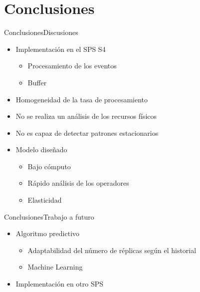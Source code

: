\section{Conclusiones}
\begin{frame}{Conclusiones}{Discusiones}

\begin{itemize}
\item Implementación en el SPS S4
\begin{itemize}
	\item Procesamiento de los eventos
	\item Buffer
\end{itemize}
\item Homogeneidad de la tasa de procesamiento
\item No se realiza un análisis de los recursos físicos
\item No es capaz de detectar patrones estacionarios
\item Modelo diseñado
	\begin{itemize}
		\item Bajo cómputo
		\item Rápido análisis de los operadores
		\item Elasticidad
	\end{itemize}
\end{itemize}

\end{frame}

\begin{frame}{Conclusiones}{Trabajo a futuro}

\begin{itemize}
\item Algoritmo predictivo
\begin{itemize}
	\item Adaptabilidad del número de réplicas según el historial
	\item Machine Learning
\end{itemize}
\item Implementación en otro SPS
\end{itemize}

\end{frame}